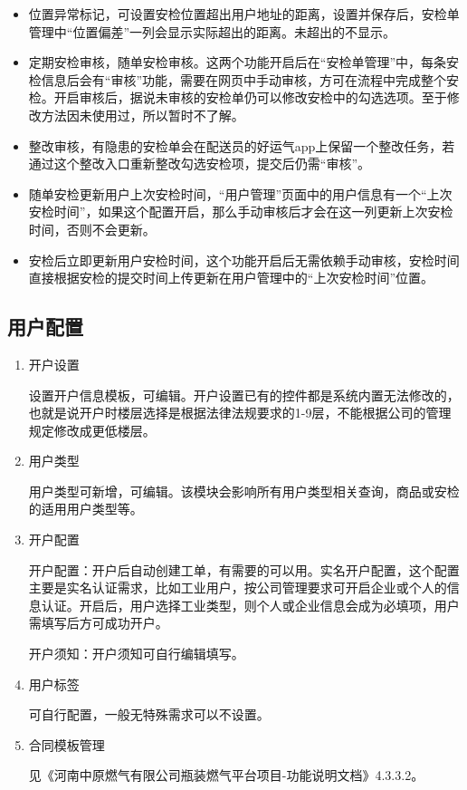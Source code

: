 \documentclass[UTF8]{ctexart}
\begin{document}
\begin{enumerate}
	\begin{itemize} 
	
	\item 位置异常标记，可设置安检位置超出用户地址的距离，设置并保存后，安检单管理中“位置偏差”一列会显示实际超出的距离。未超出的不显示。
	
	\item 定期安检审核，随单安检审核。这两个功能开启后在“安检单管理”中，每条安检信息后会有“审核”功能，需要在网页中手动审核，方可在流程中完成整个安检。开启审核后，据说未审核的安检单仍可以修改安检中的勾选选项。至于修改方法因未使用过，所以暂时不了解。
	
	\item 整改审核，有隐患的安检单会在配送员的好运气app上保留一个整改任务，若通过这个整改入口重新整改勾选安检项，提交后仍需“审核”。
	
	\item 随单安检更新用户上次安检时间，“用户管理”页面中的用户信息有一个“上次安检时间”，如果这个配置开启，那么手动审核后才会在这一列更新上次安检时间，否则不会更新。
	
	\item 安检后立即更新用户安检时间，这个功能开启后无需依赖手动审核，安检时间直接根据安检的提交时间上传更新在用户管理中的“上次安检时间”位置。
	\end{itemize}

\end{enumerate}


\subsection{用户配置}
\begin{enumerate}
	\item 开户设置
	
	设置开户信息模板，可编辑。开户设置已有的控件都是系统内置无法修改的，也就是说开户时楼层选择是根据法律法规要求的1-9层，不能根据公司的管理规定修改成更低楼层。
	
	\item 用户类型
	
	用户类型可新增，可编辑。该模块会影响所有用户类型相关查询，商品或安检的适用用户类型等。
	
	\item 开户配置
	
	开户配置：开户后自动创建工单，有需要的可以用。实名开户配置，这个配置主要是实名认证需求，比如工业用户，按公司管理要求可开启企业或个人的信息认证。开启后，用户选择工业类型，则个人或企业信息会成为必填项，用户需填写后方可成功开户。
	
	开户须知：开户须知可自行编辑填写。
	
	\item 用户标签
	
	可自行配置，一般无特殊需求可以不设置。
	
	\item 合同模板管理
	
	见《河南中原燃气有限公司瓶装燃气平台项目-功能说明文档》4.3.3.2。
	
\end{enumerate}
\end{document}
